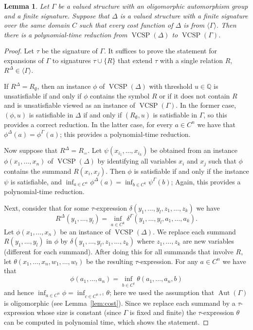 \documentclass[nonacm]{acmart}
\newcommand{\Q}{\mathbb Q}
\DeclareMathOperator{\Aut}{Aut}
\DeclareMathOperator{\VCSP}{VCSP}
\newtheorem{lemma}[theorem]{Lemma}
\begin{document}
\begin{lemma}\label{lem:expr-reduce}
Let $\Gamma$ be a valued structure with an oligomorphic 
automorphism group and a finite signature. 
Suppose that $\Delta$ is a valued structure with a finite signature over the same domain $C$ such that every cost function of $\Delta$ is from $\langle \Gamma \rangle$. 
Then there is a polynomial-time reduction from
$\VCSP(\Delta)$ to $\VCSP(\Gamma)$. 
\end{lemma}

\begin{proof}
Let $\tau$ be the signature of $\Gamma$. It suffices to prove the statement for expansions of $\Gamma$ to signatures $\tau \cup \{R\}$ that extend $\tau$ with a single relation $R$, $R^{\Delta} \in \langle \Gamma \rangle$. 

If $R^{\Delta} = R_\emptyset$,
 then an instance $\phi$ of $\VCSP(\Delta)$ with threshold $u \in \Q$ is unsatisfiable if and only if $\phi$ contains the symbol $R$ or if it does not contain $R$ and is unsatisfiable viewed as an instance of $\VCSP(\Gamma)$. 
In the former case, 
$(\phi,u)$ is satisfiable in $\Delta$ if and only if $(R_\emptyset, u)$ is satisfiable in $\Gamma$, 
so this provides a correct reduction. 
In the latter case, for every $a \in C^n$ we have that $\phi^{\Delta}(a) = \phi^{\Gamma}(a)$; 
this provides a polynomial-time reduction. 

Now suppose that $R^{\Delta} = R_=$. Let $\psi(x_{i_1},\dots,x_{i_k})$ be obtained from an instance $\phi(x_1,\dots,x_n)$ of $\VCSP(\Delta)$ by identifying all variables $x_i$ and $x_j$ such that $\phi$ contains the summand $R(x_i,x_j)$. 
Then $\phi$ is satisfiable if and only if the instance 
$\psi$ is satisfiable, and $\inf_{a \in C^n} \phi^{\Delta}(a) = \inf_{b \in C^k} \psi^{\Gamma}(b)$;
Again, this provides a polynomial-time reduction. 

Next, consider that for some $\tau$-expression $\delta(y_1,\dots,y_l,z_1,\dots,z_k)$ we have  
$$R^{\Delta}(y_1, \dots, y_l)= \inf_{a \in C^k} \delta^{\Gamma}(y_1, \dots, y_l, a_1, \dots, a_k).$$ 
Let $\phi(x_1,\dots,x_n)$ be an instance of $\VCSP(\Delta)$. 
We replace each summand $R(y_1,\dots,y_{l})$ in $\phi$ by $\delta(y_1,\dots,y_l,z_1,\dots,z_k)$ where $z_1,\dots,z_k$ are new variables (different for each summand). After doing this for all summands that involve $R$, let $\theta(x_1,\dots,x_n,w_1,\dots,w_t)$ be the resulting $\tau$-expression.  For any $a \in C^{n}$ 
we have that
$$\phi(a_1,\dots,a_n) = \inf_{b \in C^t} \theta(a_1,\dots,a_{n},b)$$
and hence $\inf_{a \in C^n} \phi = \inf_{c \in C^{n+t}} \theta$; here we used the assumption that $\Aut(\Gamma)$ is oligomorphic (see Lemma~\ref{lem:cost}). 
Since we replace each summand by a $\tau$-expression whose size is constant (since $\Gamma$ is fixed and finite) the $\tau$-expression $\theta$ can be computed in polynomial time, which shows the statement. 


\end{proof}
\end{document}
